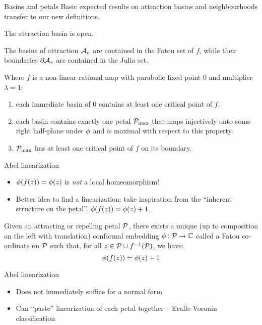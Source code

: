 \begin{frame}{Basins and petals}
    Basic expected results on attraction basins and neighbourhoods transfer to our new definitions.
    \begin{lem}
        The attraction basin is open.
    \end{lem}
    \begin{lem}
        The basins of attraction $\mathcal{A}_v$ are contained in the Fatou set of $f$, while their boundaries $\partial\mathcal{A}_v$ are contained in the Julia set.
    \end{lem}
    \begin{lem}
    Where $f$ is a non-linear rational map with parabolic fixed point 0 and multiplier $\lambda = 1$: 
        \begin{enumerate}
            \item each immediate basin of 0 contains at least one critical point of $f$.
            \item each basin contains exactly one petal $\mathcal{P}_\mathrm{max}$ that maps injectively onto some right half-plane under $\phi$ and is maximal with respect to this property. 
            \item $\mathcal{P}_\mathrm{max}$ has at least one critical point of $f$ on its boundary.
        \end{enumerate}
    \end{lem}
\end{frame}
\begin{frame}{Abel linearization}
    \begin{itemize}
        \item $\phi(f(z))=\phi(z)$ is \emph{not} a local homeomorphism!
        \item Better idea to find a linearization: take inspiration from the ``inherent structure on the petal''. $\phi(f(z))=\phi(z)+1$.
    \end{itemize}
    \begin{thm}
        Given an attracting or repelling petal $\mathcal{P}$, there exists a unique (up to composition on the left with translation) conformal embedding $\phi:\mathcal{P}\to\mathbb{C}$ called a Fatou co-ordinate on $\mathcal{P}$ such that, for all $z\in\mathcal{P}\cup {f}^{-1}(\mathcal{P})$, we have:
        \begin{equation*}
            \phi(f(z))=\phi(z)+1
        \end{equation*}
    \end{thm}
\end{frame}
\begin{frame}{Abel linearization}
    \begin{itemize}
        \item Does not immediately suffice for a normal form
        \item Can ``paste'' linearization of each petal together -- Ecalle-Voronin classification
    \end{itemize}
\end{frame}